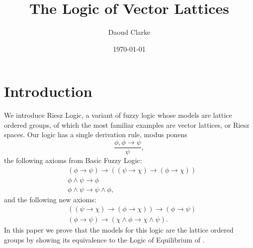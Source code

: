 \documentclass[preprint,leqno]{elsarticle}
\author{Daoud Clarke}
\date{\today}
\title{The Logic of Vector Lattices}
\begin{document}
\maketitle


\section{Introduction}

We introduce Riesz Logic, a variant of fuzzy logic whose models are
lattice ordered groups, of which the most familiar examples are vector
lattices, or Riesz spaces.
%
%
%
%
%
Our logic has a single derivation rule, modus ponens
\begin{equation}\tag{MP}
\frac{\phi, \phi \rightarrow \psi}{\psi},
\end{equation}
the following axioms from Basic Fuzzy Logic:
\begin{align}
  \tag{BL1} &(\phi \rightarrow \psi) \rightarrow ((\psi \rightarrow \chi)
  \rightarrow (\phi \rightarrow \chi))\\
  \tag{BL2} &\phi \land \psi \rightarrow \phi\\
  \tag{BL3} &\phi \land \psi \rightarrow \psi \land \phi,
\end{align}
and the following new axioms:
\begin{align}
  \tag{R1}  &((\psi \rightarrow \chi) \rightarrow (\phi \rightarrow
  \chi)) \rightarrow (\phi \rightarrow \psi)\\
  \tag{R2}  &(\phi \rightarrow \psi) \rightarrow (\chi \land \phi
  \rightarrow \chi \land \psi).
\end{align}
In this paper we prove that the models for this logic are the lattice
ordered groups by showing its equivalence to the Logic of Equilibrium
of \cite{Galli:04}.

\end{document}
